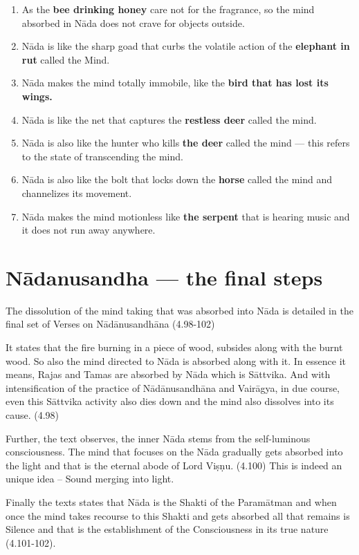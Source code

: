 \begin{enumerate}
\itemsep=0pt
\item As the \textbf{bee drinking honey} care not for the fragrance, so the mind absorbed in Nāda does not crave for objects outside.
\item Nāda is like the sharp goad that curbs the volatile action of the \textbf{elephant in rut} called the Mind.
\item Nāda makes the mind totally immobile, like the \textbf{bird that has lost its wings.}
\item Nāda is like the net that captures the \textbf{restless deer} called the mind.
\item Nāda is also like the hunter who kills \textbf{the deer} called the mind --- this refers to the state of transcending the mind. 
\item Nāda is also like the bolt that locks down the \textbf{horse} called the mind and channelizes its movement. 
\item Nāda makes the mind motionless like \textbf{the serpent} that is hearing music and it does not run away anywhere.
\end{enumerate}

\section*{Nādanusandha --- the final steps}

The dissolution of the mind taking that was absorbed into Nāda is detailed in the final set of Verses on Nādānusandhāna (4.98-102) 
 
It states that the fire burning in a piece of wood, subsides along with the burnt wood. So also the mind directed to Nāda is absorbed along with it. In essence it means, Rajas and Tamas are absorbed by Nāda which is Sāttvika. And with intensification of the practice of Nādānusandhāna and Vairāgya, in due course, even this Sāttvika activity also dies down and the mind also dissolves into its cause. (4.98)

Further, the text observes, the inner Nāda stems from the self-luminous consciousness. The mind that focuses on the Nāda gradually gets absorbed into the light and that is the eternal abode of Lord Viṣṇu. (4.100) This is indeed an unique idea – Sound merging into light.
 
Finally the texts states that Nāda is the Shakti of the Paramātman and when once the mind takes recourse to this Shakti and gets absorbed all that remains is Silence and that is the establishment of the Consciousness in its true nature (4.101-102).  

